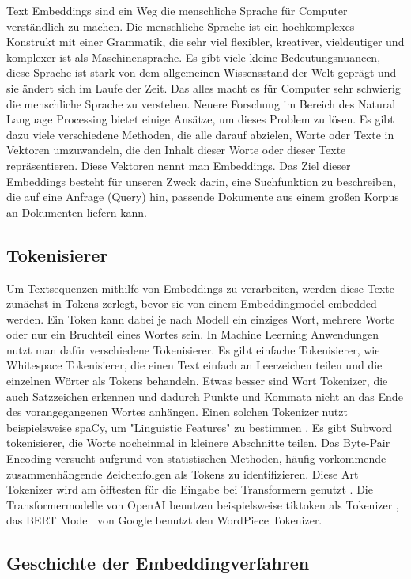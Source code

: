 Text Embeddings sind ein Weg die menschliche Sprache für Computer verständlich zu machen. 
Die menschliche Sprache ist ein hochkomplexes Konstrukt mit einer Grammatik, die sehr viel flexibler, kreativer, vieldeutiger und komplexer ist als Maschinensprache. 
Es gibt viele kleine Bedeutungsnuancen, diese Sprache ist stark von dem allgemeinen Wissensstand der Welt geprägt und sie ändert sich im Laufe der Zeit. 
Das alles macht es für Computer sehr schwierig die menschliche Sprache zu verstehen. 
Neuere Forschung im Bereich des Natural Language Processing bietet einige Ansätze, um dieses Problem zu lösen. 
Es gibt dazu viele verschiedene Methoden, die alle darauf abzielen, Worte oder Texte in Vektoren umzuwandeln, die den Inhalt dieser Worte oder dieser Texte repräsentieren.
Diese Vektoren nennt man Embeddings.
Das Ziel dieser Embeddings besteht für unseren Zweck darin, eine Suchfunktion zu beschreiben, die auf eine Anfrage (Query) hin, passende Dokumente aus einem großen Korpus an Dokumenten liefern kann.

\subsection{Tokenisierer}

Um Textsequenzen mithilfe von Embeddings zu verarbeiten, werden diese Texte zunächst in Tokens zerlegt, bevor sie von einem Embeddingmodel embedded werden.  
Ein Token kann dabei je nach Modell ein einziges Wort, mehrere Worte oder nur ein Bruchteil eines Wortes sein.
In Machine Leerning Anwendungen nutzt man dafür verschiedene Tokenisierer.
Es gibt einfache Tokenisierer, wie Whitespace Tokenisierer, die einen Text einfach an Leerzeichen teilen und die einzelnen Wörter als Tokens behandeln.
Etwas besser sind Wort Tokenizer, die auch Satzzeichen erkennen und dadurch Punkte und Kommata nicht an das Ende des vorangegangenen Wortes anhängen. 
Einen solchen Tokenizer nutzt beispielsweise spaCy, um "Linguistic Features" zu bestimmen \cite{honnibal2017}.
Es gibt Subword tokenisierer, die Worte nocheinmal in kleinere Abschnitte teilen.
Das Byte-Pair Encoding versucht aufgrund von statistischen Methoden, häufig vorkommende zusammenhängende Zeichenfolgen als Tokens zu identifizieren.
Diese Art Tokenizer wird am öfftesten für die Eingabe bei Transformern genutzt \cite{zouhar2023}.
Die Transformermodelle von OpenAI benutzen beispielsweise tiktoken als Tokenizer \cite{tiktoken2024}, das BERT Modell von Google benutzt den WordPiece Tokenizer.

\subsection{Geschichte der Embeddingverfahren}

